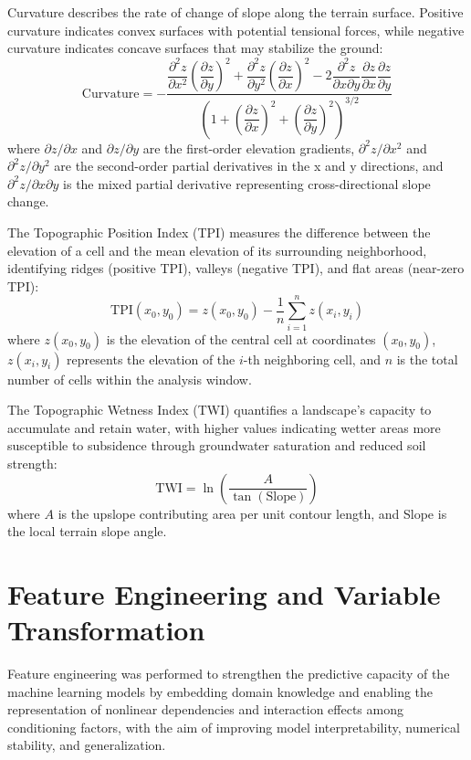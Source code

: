\documentclass[oneside,doublespacing,flushright]{lsuthesis}
\begin{document}
Curvature describes the rate of change of slope along the terrain surface. Positive curvature indicates convex surfaces with potential tensional forces, while negative curvature indicates concave surfaces that may stabilize the ground:
\begin{equation}
\text{Curvature} = -\frac{\dfrac{\partial^2 z}{\partial x^2}\left(\dfrac{\partial z}{\partial y}\right)^{\!2} + \dfrac{\partial^2 z}{\partial y^2}\left(\dfrac{\partial z}{\partial x}\right)^{\!2} - 2\dfrac{\partial^2 z}{\partial x \partial y}\dfrac{\partial z}{\partial x}\dfrac{\partial z}{\partial y}}{\left(1 + \left(\dfrac{\partial z}{\partial x}\right)^{\!2} + \left(\dfrac{\partial z}{\partial y}\right)^{\!2}\right)^{3/2}}
\end{equation}
where $\partial z/\partial x$ and $\partial z/\partial y$ are the first-order elevation gradients, $\partial^2 z/\partial x^2$ and $\partial^2 z/\partial y^2$ are the second-order partial derivatives in the x and y directions, and $\partial^2 z/\partial x \partial y$ is the mixed partial derivative representing cross-directional slope change.

The Topographic Position Index (TPI) measures the difference between the elevation of a cell and the mean elevation of its surrounding neighborhood, identifying ridges (positive TPI), valleys (negative TPI), and flat areas (near-zero TPI):
\begin{equation}
\text{TPI}(x_0, y_0) = z(x_0, y_0) - \frac{1}{n}\sum_{i=1}^{n} z(x_i, y_i)
\end{equation}
where $z(x_0, y_0)$ is the elevation of the central cell at coordinates $(x_0, y_0)$, $z(x_i, y_i)$ represents the elevation of the $i$-th neighboring cell, and $n$ is the total number of cells within the analysis window.

The Topographic Wetness Index (TWI) quantifies a landscape's capacity to accumulate and retain water, with higher values indicating wetter areas more susceptible to subsidence through groundwater saturation and reduced soil strength:
\begin{equation}
\text{TWI} = \ln\!\left(\frac{A}{\tan(\text{Slope})}\right)
\end{equation}
where $A$ is the upslope contributing area per unit contour length, and Slope is the local terrain slope angle.

\section{Feature Engineering and Variable Transformation}
Feature engineering was performed to strengthen the predictive capacity of the machine learning models by embedding domain knowledge and enabling the representation of nonlinear dependencies and interaction effects among conditioning factors, with the aim of improving model interpretability, numerical stability, and generalization.
\end{document}

